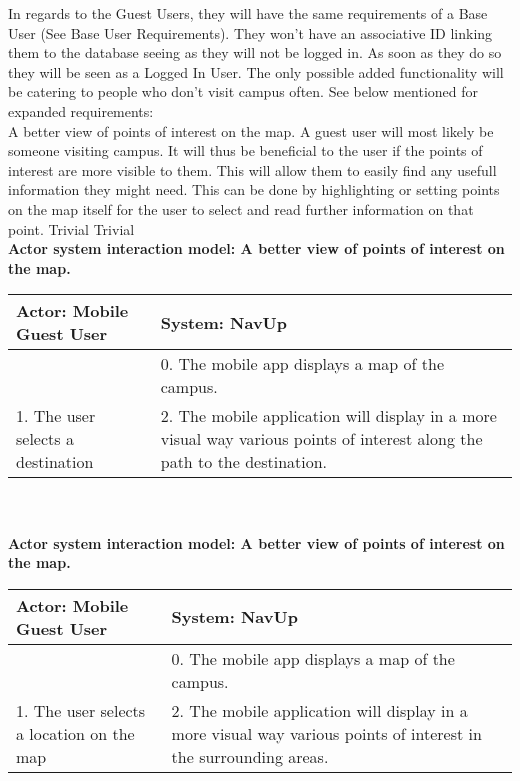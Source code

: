 In regards to the Guest Users, they will have the same requirements of a Base User (See Base User Requirements). They won't have an associative ID linking them to the database seeing as they will not be logged in. As soon as they do so they will be seen as a Logged In User. The only possible added functionality will be catering to people who don't visit campus often. See below mentioned for expanded requirements:
\bigskip
\\    

\FuncReq
{A better view of points of interest on the map.}
{A guest user will most likely be someone visiting campus. It will thus be beneficial to the user if the points of interest are more visible to them. This will allow them to easily find any usefull information they might need. This can be done by highlighting or setting points on the map itself for the user to select and read further information on that point.}
{Trivial}
{Trivial}
\\
\textbf{Actor system interaction model: A better view of points of interest on the map.}\\
\begin{tabular}{ | p{6cm} | p{6cm} |}
\hline
Actor: Mobile Guest User & System: NavUp \\ \hline
& 0. The mobile app displays a map of the campus.\\ \hline
1. The user selects a destination & 2. The mobile application will display in a more visual way various points of interest along the path to the destination.\\ \hline
\end{tabular}
\\
\bigskip
\\    
\textbf{Actor system interaction model: A better view of points of interest on the map. }\\
\begin{tabular}{ | p{6cm} | p{6cm} |}
\hline
Actor: Mobile Guest User & System: NavUp \\ \hline
& 0. The mobile app displays a map of the campus.\\ \hline
1. The user selects a location on the map & 2. The mobile application will display in a more visual way various points of interest in the surrounding areas.\\ \hline
\end{tabular}
\\
\bigskip

